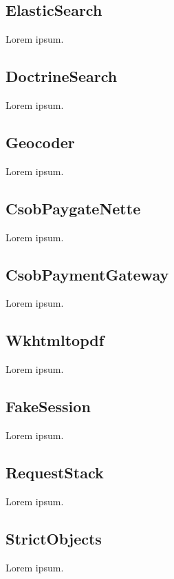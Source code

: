 \tocless\subsection{ElasticSearch}

Lorem ipsum.

\tocless\subsection{DoctrineSearch}

Lorem ipsum.

\tocless\subsection{Geocoder}

Lorem ipsum.

\tocless\subsection{CsobPaygateNette}

Lorem ipsum.

\tocless\subsection{CsobPaymentGateway}

Lorem ipsum.

\tocless\subsection{Wkhtmltopdf}

Lorem ipsum.

\tocless\subsection{FakeSession}

Lorem ipsum.

\tocless\subsection{RequestStack}

Lorem ipsum.

\tocless\subsection{StrictObjects}

Lorem ipsum.

